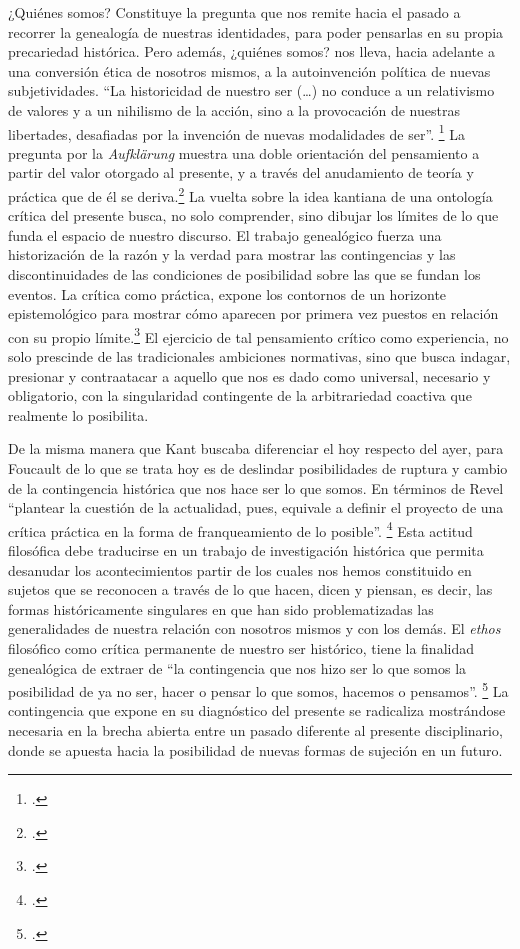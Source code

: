 ¿Quiénes somos? Constituye la pregunta que nos remite hacia el pasado a recorrer la genealogía de nuestras identidades, para poder pensarlas en su propia precariedad histórica. Pero además, ¿quiénes somos? nos lleva, hacia adelante a una conversión ética de nosotros mismos, a la autoinvención política de nuevas subjetividades. \enquote{La historicidad de nuestro ser (\ldots) no conduce a un relativismo de valores y a un nihilismo de la acción, sino a la provocación de nuestras libertades, desafiadas por la invención de nuevas modalidades de ser}. \footcite[][129-130]{@7039-GROS2007} La pregunta por la \emph{Aufklärung} muestra una doble orientación del pensamiento a partir del valor otorgado al presente, y a través del anudamiento de teoría y práctica que de él se deriva.\footcite{@7040-LEBLANC2008} La vuelta sobre la idea kantiana de una ontología crítica del presente busca, no solo comprender, sino dibujar los límites de lo que funda el espacio de nuestro discurso. El trabajo genealógico fuerza una historización de la razón y la verdad para mostrar las contingencias y las discontinuidades de las condiciones de posibilidad sobre las que se fundan los eventos. La crítica como práctica, expone los contornos de un horizonte epistemológico para mostrar cómo aparecen por primera vez puestos en relación con su propio límite.\footcite[][5]{@7036-BUTLER2001} El ejercicio de tal pensamiento crítico como experiencia, no solo prescinde de las tradicionales ambiciones normativas, sino que busca indagar, presionar y contraatacar a aquello que nos es dado como universal, necesario y obligatorio, con la singularidad contingente de la arbitrariedad coactiva que realmente lo posibilita.

De la misma manera que Kant buscaba diferenciar el hoy respecto del ayer, para Foucault de lo que se trata hoy es de deslindar posibilidades de ruptura y cambio de la contingencia histórica que nos hace ser lo que somos. En términos de Revel \enquote{plantear la cuestión de la actualidad, pues, equivale a definir el proyecto de una crítica práctica en la forma de franqueamiento de lo posible}. \footcite[][13]{@7041-REVEL2008} Esta actitud filosófica debe traducirse en un trabajo de investigación histórica que permita desanudar los acontecimientos partir de los cuales nos hemos constituido en sujetos que se reconocen a través de lo que hacen, dicen y piensan, es decir, las formas históricamente singulares en que han sido problematizadas las generalidades de nuestra relación con nosotros mismos y con los demás. El \emph{ethos} filosófico como crítica permanente de nuestro ser histórico, tiene la finalidad genealógica de extraer de \enquote{la contingencia que nos hizo ser lo que somos la posibilidad de ya no ser, hacer o pensar lo que somos, hacemos o pensamos}. \footcite[][102]{@7037-FOUCAULT2002} La contingencia que expone en su diagnóstico del presente se radicaliza mostrándose necesaria en la brecha abierta entre un pasado diferente al presente disciplinario, donde se apuesta hacia la posibilidad de nuevas formas de sujeción en un futuro.

